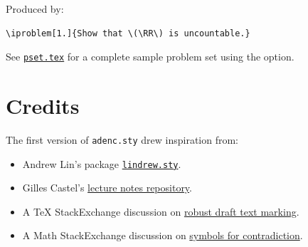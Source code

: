 \documentclass[12pt]{article}
\newcommand{\cmd}[1]{\texttt{\small\detokenize{#1}}}
\begin{document}

\noindent Produced by:
\begin{verbatim}
\iproblem[1.]{Show that \(\RR\) is uncountable.}
\end{verbatim}

See \href{https://github.com/AdenChen27/LaTeX/blob/main/sample/pset.tex}{\texttt{pset.tex}} for a complete sample problem set using the \cmd{pset} option.

\appendix
\section{Credits}
The first version of \texttt{adenc.sty} drew inspiration from:

\begin{itemize}
\item Andrew Lin's package
      \href{https://web.stanford.edu/~lindrew/lindrew.sty}{\texttt{lindrew.sty}}.

\item Gilles Castel's
      \href{https://github.com/gillescastel/lecture-notes}{lecture notes repository}.

\item A TeX StackExchange discussion on
      \href{https://tex.stackexchange.com/questions/142242/robust-way-to-mark-draft-text}{robust draft text marking}.

\item A Math StackExchange discussion on
      \href{https://math.stackexchange.com/questions/160039/are-there-any-symbols-for-contradictions}{symbols for contradiction}.
\end{itemize}
\end{document}
